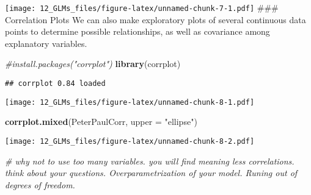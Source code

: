 \documentclass[]{article}
\newenvironment{Shaded}{\begin{snugshade}}{\end{snugshade}}
\newcommand{\KeywordTok}[1]{\textcolor[rgb]{0.13,0.29,0.53}{\textbf{#1}}}
\newcommand{\DataTypeTok}[1]{\textcolor[rgb]{0.13,0.29,0.53}{#1}}
\newcommand{\StringTok}[1]{\textcolor[rgb]{0.31,0.60,0.02}{#1}}
\newcommand{\CommentTok}[1]{\textcolor[rgb]{0.56,0.35,0.01}{\textit{#1}}}
\newcommand{\OperatorTok}[1]{\textcolor[rgb]{0.81,0.36,0.00}{\textbf{#1}}}
\newcommand{\NormalTok}[1]{#1}
\begin{document}
\texttt{[image: 12\_GLMs\_files/figure-latex/unnamed-chunk-7-1.pdf]}
\#\#\# Correlation Plots We can also make exploratory plots of several
continuous data points to determine possible relationships, as well as
covariance among explanatory variables.

\begin{Shaded}
\begin{Highlighting}[]
\CommentTok{#install.packages("corrplot")}
\KeywordTok{library}\NormalTok{(corrplot)}
\end{Highlighting}
\end{Shaded}

\begin{verbatim}
## corrplot 0.84 loaded
\end{verbatim}

\begin{Shaded}
\end{Shaded}

\texttt{[image: 12\_GLMs\_files/figure-latex/unnamed-chunk-8-1.pdf]}

\begin{Shaded}
\begin{Highlighting}[]
\KeywordTok{corrplot.mixed}\NormalTok{(PeterPaulCorr, }\DataTypeTok{upper =} \StringTok{"ellipse"}\NormalTok{)}
\end{Highlighting}
\end{Shaded}

\texttt{[image: 12\_GLMs\_files/figure-latex/unnamed-chunk-8-2.pdf]}

\begin{Shaded}
\begin{Highlighting}[]
\CommentTok{# why not to use too many variables. you will find meaning less correlations. think about your questions. Overparametrization of your model. Runing out of degrees of freedom.}
\end{Highlighting}
\end{Shaded}
\end{document}
